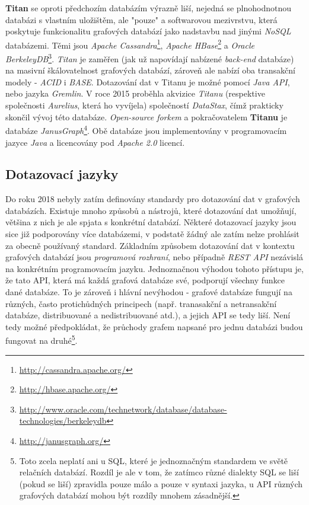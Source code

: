 \textbf{Titan} se oproti předchozím databázím výrazně liší, nejedná se plnohodnotnou databázi s vlastním uložištěm, ale "pouze" a softwarovou mezivrstvu, která poskytuje funkcionalitu grafových databází jako nadstavbu nad jinými \textit{NoSQL} databázemi. Těmi jsou \textit{Apache Cassandra}\footnote{\url{http://cassandra.apache.org/}}, \textit{Apache HBase}\footnote{\url{http://hbase.apache.org/}} a \textit{Oracle BerkeleyDB}\footnote{\url{http://www.oracle.com/technetwork/database/database-technologies/berkeleydb}}.
\textit{Titan} je zaměřen (jak už napovídají nabízené \textit{back-end} databáze) na masivní škálovatelnost grafových databází, zároveň ale nabízí oba transakční modely - \textit{ACID} i \textit{BASE}. Dotazování dat v Titanu je možné pomocí \textit{Java API}, nebo jazyka \textit{Gremlin}. V roce 2015 proběhla akvizice \textit{Titanu} (respektive společnosti \textit{Aurelius}, která ho vyvíjela) společností \textit{DataStax}, čímž prakticky skončil vývoj této databáze. \textit{Open-source forkem} a pokračovatelem\cite{Datami17} \textbf{Titanu} je databáze \textit{JanusGraph}\footnote{\url{http://janusgraph.org/}}. Obě databáze jsou implementovány v programovacím jazyce \textit{Java} a licencovány pod \textit{Apache 2.0} licencí.


\subsection{Dotazovací jazyky}
\label{sec:gdb-jazyky}

Do roku 2018 nebyly zatím definovány standardy pro dotazování dat v grafových databázích. Existuje mnoho způsobů a nástrojů, které dotazování dat umožňují, většina z nich je ale spjata s konkrétní databází. Některé dotazovací jazyky jsou sice již podporovány více databázemi, v podstatě žádný ale zatím nelze prohlásit za obecně používaný standard. Základním způsobem dotazování dat v kontextu grafových databází jsou \textit{programová rozhraní}, nebo případně \textit{REST API} nezávislá na konkrétním programovacím jazyku. Jednoznačnou výhodou tohoto přístupu je, že tato API, která má každá grafová databáze své, podporují všechny funkce dané databáze. To je zároveň i hlávní nevýhodou - grafové databáze fungují na různých, často protichůdných principech (např. tranasakční a netransakční databáze, distribuované a nedistribuované atd.), a jejich API se tedy liší. Není tedy možné předpokládat, že průchody grafem napsané pro jednu databázi budou fungovat na druhé\footnote{Toto zcela neplatí ani u SQL, které je jednoznačným standardem ve světě relačních databází. Rozdíl je ale v tom, že zatímco různé dialekty SQL se liší (pokud se liší) zpravidla pouze málo a pouze v syntaxi jazyka, u API různých grafových databází mohou být rozdíly mnohem zásadnější.}.

